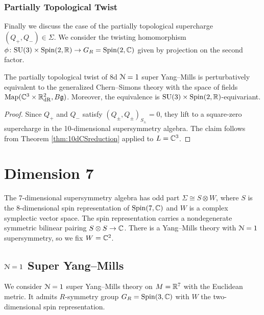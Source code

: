 \documentclass[10pt, oneside]{article}
\begin{document}
\subsubsection{Partially Topological Twist}
\label{sect:8dpartiallytopologicaltwist}

Finally we discuss the case of the partially topological supercharge $(Q_+, Q_-)\in\Sigma$. We consider the twisting homomorphism $\phi\colon \mathrm{SU}(3)\times \mathrm{Spin}(2, \mathbb R)\rightarrow G_R=\mathrm{Spin}(2, \mathbb C)$ given by projection on the second factor.

\begin{theorem}
The partially topological twist of 8d $\mathcal N=1$ super Yang--Mills is perturbatively equivalent to the generalized Chern--Simons theory with the space of fields $\operatorname{Map}(\mathbb C^3\times \mathbb R^2_{\mathrm{dR}}, B\mathfrak g)$. Moreover, the equivalence is $\mathrm{SU}(3)\times \mathrm{Spin}(2, \mathbb R)$-equivariant.
\label{thm:8dpartiallytopologicaltwist}
\end{theorem}
\begin{proof}
Since $Q_+$ and $Q_-$ satisfy $(Q_\pm, Q_\pm)_{S_\pm} = 0$, they lift to a square-zero supercharge in the 10-dimensional supersymmetry algebra. The claim follows from Theorem \ref{thm:10dCSreduction} applied to $L=\mathbb C^3$.
\end{proof}

\section{Dimension 7} \label{7d_section}

The 7-dimensional supersymmetry algebra has odd part $\Sigma\cong S\otimes W$, where $S$ is the 8-dimensional spin representation of $\mathrm{Spin}(7, \mathbb C)$ and $W$ is a complex symplectic vector space.  The spin representation carries a nondegenerate symmetric bilinear pairing $S\otimes S\rightarrow \mathbb C$. There is a Yang--Mills theory with $\mathcal{N}=1$ supersymmetry, so we fix $W = \mathbb C^2$.

\subsection{\texorpdfstring{$\mathcal N=1$}{N=1} Super Yang--Mills}

We consider $\mathcal N=1$ super Yang--Mills theory on $M=\mathbb R^7$ with the Euclidean metric. It admits $R$-symmetry group $G_R=\mathrm{Spin}(3, \mathbb C)$ with $W$ the two-dimensional spin representation.
\end{document}
